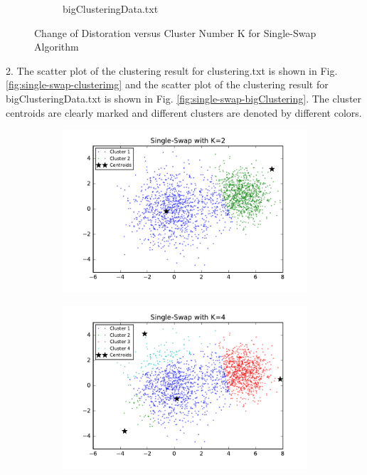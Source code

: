 \begin{description}
\begin{description}
\begin{figure}[H]
\begin{subfigure}[b]{0.49\textwidth}
            \caption{bigClusteringData.txt}\label{fig:7b}
        \end{subfigure}
\caption{Change of Distoration versus Cluster Number K for Single-Swap Algorithm}
\label{fig:single-swap-loss} 
\end{figure}

\item{2.} The scatter plot of the clustering result for clustering.txt is shown in Fig. \ref{fig:single-swap-clusterimg} and the scatter plot of the clustering result for bigClusteringData.txt is shown in Fig. \ref{fig:single-swap-bigClustering}. The cluster centroids are clearly marked and different clusters are denoted by different colors. 

\begin{figure}[!h]
        \centering
        \begin{subfigure}[b]{0.475\textwidth}
            \centering
            \includegraphics[width=\textwidth]{./figures/clustering_singleSwap_2.pdf}
        \end{subfigure}
        \hfill
        \begin{subfigure}[b]{0.475\textwidth}  
            \centering 
            \includegraphics[width=\textwidth]{./figures/clustering_singleSwap_4.pdf}

\end{subfigure}
\end{figure}
\end{description}
\end{description}

